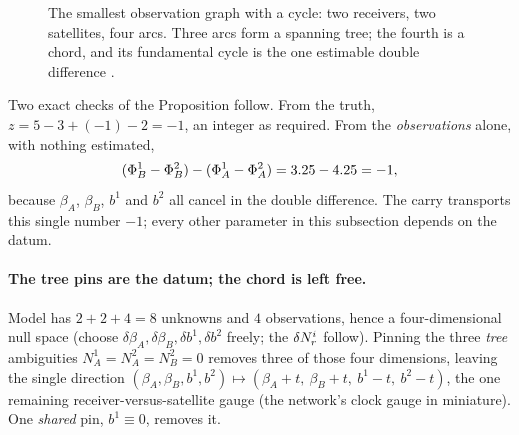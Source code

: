 \documentclass[main.tex]{subfiles}
\begin{document}
\begin{figure}[htbp]
\centering
{}
\caption{The smallest observation graph with a cycle: two receivers,
two satellites, four arcs.  Three arcs form a spanning tree; the fourth
is a chord, and its fundamental cycle is the one estimable double
difference .}
\label{fig:carry-ex-graph}
\end{figure}

Two exact checks of the Proposition follow.  From the truth,
$z = 5 - 3 + (-1) - 2 = -1$, an integer as required.  From the
\emph{observations} alone, with nothing estimated,
\[
(\Phi^1_B - \Phi^2_B) - (\Phi^1_A - \Phi^2_A)
  = 3.25 - 4.25 = -1,
\]
because $\beta_A$, $\beta_B$, $b^1$ and $b^2$ all cancel in the double
difference.  The carry transports this single number $-1$; every other
parameter in this subsection depends on the datum.

\paragraph{The tree pins are the datum; the chord is left free.}
Model  has $2+2+4 = 8$ unknowns and $4$
observations, hence a four-dimensional null space (choose
$\delta\beta_A,\delta\beta_B,\delta b^1,\delta b^2$ freely; the
$\delta N^{i}_{r}$ follow).  Pinning the three \emph{tree}
ambiguities $N^1_A = N^2_A = N^2_B = 0$ removes three of those four
dimensions, leaving the single direction
$(\beta_A,\beta_B,b^1,b^2)\mapsto(\beta_A+t,\ \beta_B+t,\ b^1-t,\ b^2-t)$,
the one remaining receiver-versus-satellite gauge (the network's clock
gauge in miniature).  One \emph{shared} pin, $b^1 \equiv 0$, removes
it.
\end{document}
